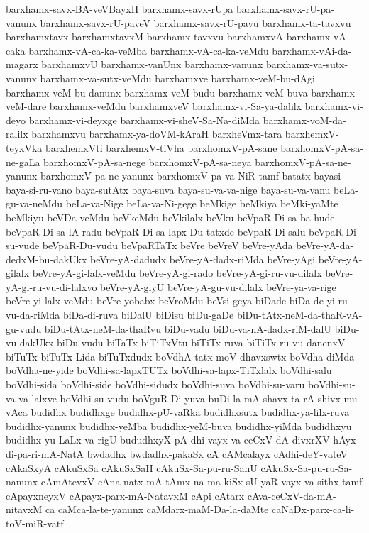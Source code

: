 {barxhamx-savx-BA-veVBayxH
barxhamx-savx-rUpa
barxhamx-savx-rU-pa-vanunx
barxhamx-savx-rU-paveV
barxhamx-savx-rU-pavu
barxhamx-ta-tavxvu
barxhamxtavx
barxhamxtavxM
barxhamx-tavxvu
barxhamxvA
barxhamx-vA-caka
barxhamx-vA-ca-ka-veMba
barxhamx-vA-ca-ka-veMdu
barxhamx-vAi-da-magarx
barxhamxvU
barxhamx-vanUnx
barxhamx-vanunx
barxhamx-va-sutx-vanunx
barxhamx-va-sutx-veMdu
barxhamxve
barxhamx-veM-bu-dAgi
barxhamx-veM-bu-danunx
barxhamx-veM-budu
barxhamx-veM-buva
barxhamx-veM-dare
barxhamx-veMdu
barxhamxveV
barxhamx-vi-Sa-ya-dalilx
barxhamx-vi-deyo
barxhamx-vi-deyxge
barxhamx-vi-sheV-Sa-Na-diMda
barxhamx-voM-da-ralilx
barxhamxvu
barxhamx-ya-doVM-kAraH
barxheVmx-tara
barxhemxV-teyxVka
barxhemxVti
barxhemxV-tiVha
barxhomxV-pA-sane
barxhomxV-pA-sa-ne-gaLa
barxhomxV-pA-sa-nege
barxhomxV-pA-sa-neya
barxhomxV-pA-sa-ne-yanunx
barxhomxV-pa-ne-yanunx
barxhomxV-pa-va-NiR-tamf
batatx
bayasi
baya-si-ru-vano
baya-sutAtx
baya-suva
baya-su-va-va-nige
baya-su-va-vanu
beLa-gu-va-neMdu
beLa-va-Nige
beLa-va-Ni-gege
beMkige
beMkiya
beMki-yaMte
beMkiyu
beVDa-veMdu
beVkeMdu
beVkilalx
beVku
beVpaR-Di-sa-ba-hude
beVpaR-Di-sa-lA-radu
beVpaR-Di-sa-lapx-Du-tatxde
beVpaR-Di-salu
beVpaR-Di-su-vude
beVpaR-Du-vudu
beVpaRTaTx
beVre
beVreV
beVre-yAda
beVre-yA-da-dedxM-bu-dakUkx
beVre-yA-dadudx
beVre-yA-dadx-riMda
beVre-yAgi
beVre-yA-gilalx
beVre-yA-gi-lalx-veMdu
beVre-yA-gi-rado
beVre-yA-gi-ru-vu-dilalx
beVre-yA-gi-ru-vu-di-lalxvo
beVre-yA-giyU
beVre-yA-gu-vu-dilalx
beVre-ya-va-rige
beVre-yi-lalx-veMdu
beVre-yobabx
beVroMdu
beVsi-geya
biDade
biDa-de-yi-ru-vu-da-riMda
biDa-di-ruva
biDalU
biDisu
biDu-gaDe
biDu-tAtx-neM-da-thaR-vA-gu-vudu
biDu-tAtx-neM-da-thaRvu
biDu-vadu
biDu-va-nA-dadx-riM-dalU
biDu-vu-dakUkx
biDu-vudu
biTaTx
biTiTxVtu
biTiTx-ruva
biTiTx-ru-vu-danenxV
biTuTx
biTuTx-Lida
biTuTxdudx
boVdhA-tatx-moV-dhavxswtx
boVdha-diMda
boVdha-ne-yide
boVdhi-sa-lapxTUTx
boVdhi-sa-lapx-TiTxlalx
boVdhi-salu
boVdhi-sida
boVdhi-side
boVdhi-sidudx
boVdhi-suva
boVdhi-su-varu
boVdhi-su-va-va-lalxve
boVdhi-su-vudu
boVguR-Di-yuva
buDi-la-mA-shavx-ta-rA-shivx-mu-vAca
budidhx
budidhxge
budidhx-pU-vaRka
budidhxsutx
budidhx-ya-lilx-ruva
budidhx-yanunx
budidhx-yeMba
budidhx-yeM-buva
budidhx-yiMda
budidhxyu
budidhx-yu-LaLx-va-rigU
bududhxyX-pA-dhi-vayx-va-ceCxV-dA-divxrXV-hAyx-di-pa-ri-mA-NatA
bwdadhx
bwdadhx-pakaSx
cA
cAMcalayx
cAdhi-deY-vateV
cAkaSxyA
cAkuSxSa
cAkuSxSaH
cAkuSx-Sa-pu-ru-SanU
cAkuSx-Sa-pu-ru-Sa-nanunx
cAmAtevxV
cAna-natx-mA-tAmx-na-ma-kiSx-sU-yaR-vayx-va-sithx-tamf
cApayxneyxV
cApayx-parx-mA-NatavxM
cApi
cAtarx
cAva-ceCxV-da-mA-nitavxM
ca
caMca-la-te-yanunx
caMdarx-maM-Da-la-daMte
caNaDx-parx-ca-li-toV-miR-vatf
}
